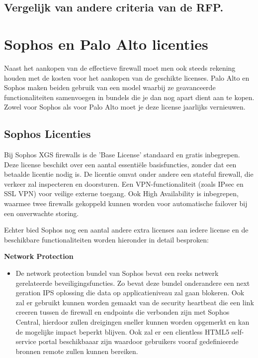 \subsection{Vergelijk van andere criteria van de RFP.}



\section{Sophos en Palo Alto licenties}
Naast het aankopen van de effectieve firewall moet men ook steeds rekening houden met de kosten voor het aankopen van de geschikte licenses. Palo Alto en Sophos maken beiden gebruik van een model waarbij ze
geavanceerde functionaliteiten samenvoegen in bundels die je dan nog apart dient aan te kopen. Zowel voor Sophos als voor Palo Alto moet je deze license jaarlijks vernieuwen.


\subsection{Sophos Licenties}
Bij Sophos XGS firewalls is de 'Base License' standaard en gratis inbegrepen. Deze license beschikt over een aantal essentiële basisfuncties, zonder dat een betaalde licentie nodig is. De licentie omvat onder andere een stateful firewall, die verkeer zal inspecteren en doorsturen. Een VPN-functionaliteit (zoals IPsec en SSL VPN) voor veilige externe toegang. Ook High Availability is inbegrepen, waarmee twee firewalls gekoppeld kunnen worden voor automatische failover bij een onverwachte storing.

Echter bied Sophos nog een aantal andere extra licenses aan iedere license en de beschikbare functionaliteiten worden hieronder in detail besproken:

\textbf{Network Protection}
\begin{itemize}[label=\textbullet]
    \item De network protection bundel van Sophos bevat een reeks netwerk gerelateerde beveiligingsfuncties. Zo bevat deze bundel onderandere een next geration IPS oplossing die data op applicatieniveau zal gaan blokeren. Ook zal er gebruikt kunnen worden gemaakt van de security heartbeat die een link creeren tussen de firewall en endpoints die verbonden zijn met Sophos Central, hierdoor zullen dreigingen sneller kunnen worden opgemerkt en kan de mogelijke impact beperkt blijven. Ook zal er een clientless HTML5 self-service portal beschikbaaar zijn waardoor gebruikers vooraf gedefinieerde bronnen remote zullen kunnen bereiken.
\end{itemize}


